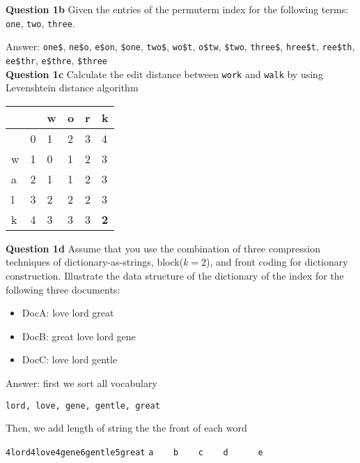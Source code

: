 \documentclass[11pt,a4paper]{report}
\begin{document}
\begin{multicols*}{2}
\noindent \textbf{Question 1b} Given the entries of the permuterm index for the following terms: \verb|one|, \verb|two|, \verb|three|.

\noindent Answer: \verb|one$|, \verb|ne$o|, \verb|e$on|, \verb|$one|, \verb|two$|, \verb|wo$t|, \verb|o$tw|, \verb|$two|, \verb|three$|, \verb|hree$t|, \verb|ree$th|, \verb|ee$thr|, \verb|e$thre|, \verb|$three|\\

\noindent \textbf{Question 1c} Calculate the edit distance between \verb|work| and \verb|walk| by using Levenshtein distance algorithm

\begin{center}
\begin{tabular}{ | l | l  l  l  l  l |} 
    \hline
      &   & w & o & r & k \\
    \hline
      & 0 & 1 & 2 & 3 & 4 \\
    w & 1 & 0 & 1 & 2 & 3 \\
    a & 2 & 1 & 1 & 2 & 3 \\
    l & 3 & 2 & 2 & 2 & 3 \\
    k & 4 & 3 & 3 & 3 & \textbf{2} \\
    \hline
\end{tabular}
\end{center}

\noindent \textbf{Question 1d} Assume that you use the combination of three compression techniques of dictionary-as-strings, block($k=2$), and front coding for dictionary construction. Illustrate the data structure of the dictionary of the index for the following three documents:
\begin{itemize}
    \item DocA: love lord great
    \item DocB: great love lord gene
    \item DocC: love lord gentle
\end{itemize}

\noindent Answer: first we sort all vocabulary

\begin{center}
\verb|lord, love, gene, gentle, great|
\end{center}

\noindent Then, we add length of string the the front of each word

\begin{center}
\verb|4lord4love4gene6gentle5great|
\verb|a    b    c    d      e      |
\end{center}


\end{multicols*}
\end{document}
